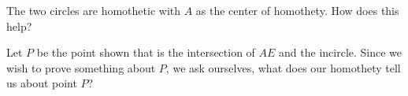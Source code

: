 







The two circles are homothetic with $A$ as the center of homothety. How does this help?

Let $P$ be the point shown that is the intersection of $AE$ and the incircle. Since we wish to prove something about $P$, we ask ourselves, what does our homothety tell us about point $P$?










